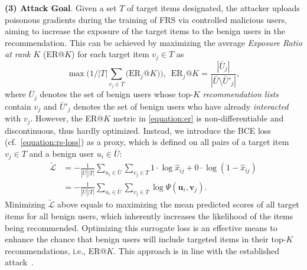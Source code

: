 \smallskip
\noindent\textbf{(3) Attack Goal}.
Given a set ${T}$ of target items designated, 
the attacker uploads poisonous gradients during the training of FRS via controlled malicious users, aiming to increase the exposure of the target items to the benign users in the recommendation. 
This can be achieved by maximizing the average \emph{Exposure Ratio at rank $K$} (ER@$K$) for each target item $v_j \in {T}$ as
\begin{equation}
\label{equation:er}
\max \Big( 1/|{T}| \sum_{v_j \in {T}} \big(\text{ER}_{j}\text{@}K \big) \Big), \,\,\, \text{ER}_{j}\text{@}K = \frac{|\bar{{U}}_j|}{|\bar{U} \setminus \bar{{U}}'_j|},
\end{equation}
where $\bar{{U}}_j$ denotes the set of benign users{} whose top-$K$ \emph{recommendation lists} contain $v_j$ and $\bar{{U}}'_j$ denotes the set of benign users who have already \emph{interacted} with $v_j$.
However, the ER@$K$ metric in \cref{equation:er} is non-differentiable and discontinuous, thus hardly optimized.
Instead, we introduce the BCE loss (cf.\ \cref{equation:rs-loss}) as a proxy, which is defined on all pairs of a target item $v_j \in {T}$ and a benign user $u_i \in \bar{{U}}$:
\begin{equation} \label{att-loss-total}
\begin{aligned}
\tilde{\mathcal{L}}
&=-\frac{1}{|\bar{{U}}| |{T}|} \sum_{u_i\in\bar{{U}}}\sum_{v_j\in{T}} 1\cdot\log\hat{x}_{ij} + 0\cdot\log(1-\hat{x}_{ij}) \\
&= -\frac{1}{|\bar{{U}}| |{T}|} \sum_{u_i\in\bar{{U}}}\sum_{v_j\in{T}} \log \Psi(\mathbf{u}_i, \mathbf{v}_j).
\end{aligned}
\end{equation}
Minimizing $\tilde{\mathcal{L}}$ above equals to maximizing the mean predicted scores of all target items for all benign users, which inherently increases the likelihood of the items being recommended.
Optimizing this surrogate loss is an effective means to enhance the chance that benign users will include targeted items in their top-$K$ recommendations, i.e., ER@$K$.
This approach is in line with the established attack~\cite{a-hum}.
